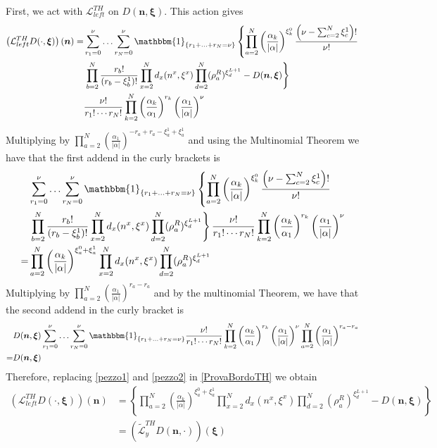 \documentclass[11pt]{article}
\numberwithin{equation}{section}
\numberwithin{equation}{subsection}
\begin{document}
First, we act with $\mathcal{L}_{left}^{TH}$ on $D(\bm{n},\bm{\xi})$. This action gives
\begin{align}\label{ProvaBordoTH}
	\left(\mathcal{L}_{left}^{TH}D(\cdot,\bm{\xi})\right)(\bm{n})=\nonumber&\sum_{r_{1}=0}^{\nu}\ldots\sum_{r_{N}=0}^{\nu}\mathbbm{1}_{\{r_{1}+\ldots+r_{N}=\nu\}}\left\{\prod_{a=2}^{N}\left(\frac{\alpha_{k}}{|\alpha|}\right)^{\xi_{k}^{0}}\frac{\left(\nu-\sum_{c=2}^{N}\xi_{c}^{1}\right)!}{\nu!}\right.
	\\&\nonumber
	\left.\prod_{b=2}^{N}\frac{r_{b}!}{(r_{b}-\xi^{1}_{b})!}\prod_{x=2}^{N}d_{x}(n^{x},\xi^{x})\prod_{d=2}^{N}(\rho_{a}^{R})^{\xi_{d}^{L+1}}-D(\bm{n},\bm{\xi})\right\}
	\\&
	\frac{\nu!}{r_{1}!\cdots r_{N}!}\prod_{k=2}^{N}\left(\frac{\alpha_{k}}{\alpha_{1}}\right)^{r_{k}}\left(\frac{\alpha_{1}}{|\alpha|}\right)^{\nu}
\end{align}
Multiplying by $\prod_{a=2}^{N}\left(\frac{\alpha_{1}}{|\alpha|}\right)^{-r_{a}+r_{a}-\xi_{a}^{1}+\xi_{a}^{1}}$ and using the Multinomial Theorem we have that the first addend in the curly brackets is
\begin{align}\label{pezzo1}
	&\sum_{r_{1}=0}^{\nu}\ldots\sum_{r_{N}=0}^{\nu}\mathbbm{1}_{\{r_{1}+\ldots+r_{N}=\nu\}}\left\{\prod_{a=2}^{N}\left(\frac{\alpha_{k}}{|\alpha|}\right)^{\xi_{k}^{0}}\frac{\left(\nu-\sum_{c=2}^{N}\xi_{c}^{1}\right)!}{\nu!}\right.\nonumber
	\\&\nonumber
	\left.\prod_{b=2}^{N}\frac{r_{b}!}{(r_{b}-\xi^{1}_{b})!}\prod_{x=2}^{N}d_{x}(n^{x},\xi^{x})\prod_{d=2}^{N}(\rho_{a}^{R})^{\xi_{d}^{L+1}}\right\}	\frac{\nu!}{r_{1}!\cdots r_{N}!}\prod_{k=2}^{N}\left(\frac{\alpha_{k}}{\alpha_{1}}\right)^{r_{k}}\left(\frac{\alpha_{1}}{|\alpha|}\right)^{\nu}\\=&
	\prod_{a=2}^{N}\left(\frac{\alpha_{k}}{|\alpha|}\right)^{\xi_{a}^{0}+\xi_{a}^{1}}\prod_{x=2}^{N}d_{x}(n^{x},\xi^{x})\prod_{d=2}^{N}(\rho_{a}^{R})^{\xi_{d}^{L+1}}
\end{align}
Multiplying by $\prod_{a=2}^{N}\left(\frac{\alpha_{1}}{|\alpha|}\right)^{r_{a}-r_{a}}$ and by the multinomial Theorem, we have that the second addend in the curly bracket is
\begin{equation}\label{pezzo2}
	\begin{split}
	&D(\bm{n},\bm{\xi})\sum_{r_{1}=0}^{\nu}\ldots\sum_{r_{N}=0}^{\nu}\mathbbm{1}_{\{r_{1}+\ldots+r_{N}=\nu\}}\frac{\nu!}{r_{1}!\cdots r_{N}!}\prod_{k=2}^{N}\left(\frac{\alpha_{k}}{\alpha_{1}}\right)^{r_{k}}\left(\frac{\alpha_{1}}{|\alpha|}\right)^{\nu}\prod_{a=2}^{N}\left(\frac{\alpha_{1}}{|\alpha|}\right)^{r_{a}-r_{a}}\\=&D(\bm{n},\bm{\xi})
	\end{split}
\end{equation}
Therefore, replacing \eqref{pezzo1} and \eqref{pezzo2} in \eqref{ProvaBordoTH} we obtain 
\begin{align}
	\left(\mathcal{L}_{left}^{TH}D(\cdot,\bm{\xi})\right)(\bm{n})&=\left\{\prod_{a=2}^{N}\left(\frac{\alpha_{k}}{|\alpha|}\right)^{\xi_{a}^{0}+\xi_{a}^{1}}\prod_{x=2}^{N}d_{x}(n^{x},\xi^{x})\prod_{d=2}^{N}(\rho_{a}^{R})^{\xi_{d}^{L+1}}-D(\bm{n},\bm{\xi})\right\}
	\\&=
	\left(\widetilde{\mathcal{L}}_{y}^{TH}D(\bm{n},\cdot)\right)(\bm{\xi})
\end{align}
\end{document}
